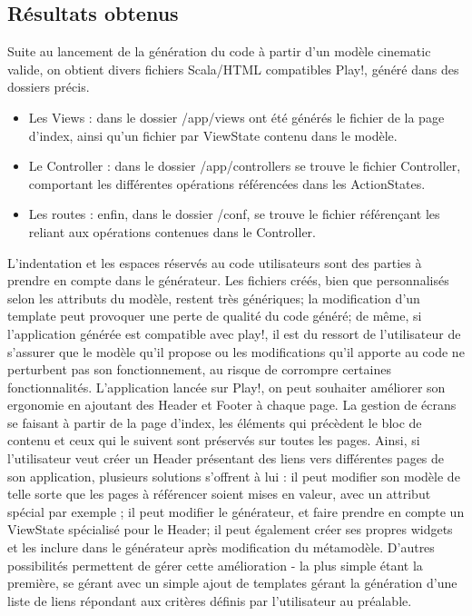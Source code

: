 \subsection{Résultats obtenus}
Suite au lancement de la génération du code à partir d'un modèle cinematic valide, on obtient divers fichiers Scala/HTML compatibles Play!, généré dans des dossiers précis.
\begin{itemize}
\item Les Views : dans le dossier /app/views ont été générés le fichier de la page d'index, ainsi qu'un fichier par ViewState contenu dans le modèle.
\item Le Controller : dans le dossier /app/controllers se trouve le fichier Controller, comportant les différentes opérations référencées dans les ActionStates.
\item Les routes : enfin, dans le dossier /conf, se trouve le fichier référençant les  reliant aux opérations contenues dans le Controller.
\end{itemize}
L'indentation et les espaces réservés au code utilisateurs sont des parties à prendre en compte dans le générateur. Les fichiers créés, bien que personnalisés selon les attributs du modèle, restent très génériques; la modification d'un template peut provoquer une perte de qualité du code généré; de même, si l'application générée est compatible avec play!, il est du ressort de l'utilisateur de s'assurer que le modèle qu'il propose ou les modifications qu'il apporte au code ne perturbent pas son fonctionnement, au risque de corrompre certaines fonctionnalités.
\newline
L'application lancée sur Play!, on peut souhaiter améliorer son ergonomie en ajoutant des Header et Footer à chaque page. La gestion de écrans se faisant à partir de la page d'index, les éléments qui précèdent le bloc de contenu et ceux qui le suivent sont préservés sur toutes les pages. Ainsi, si l'utilisateur veut créer un Header présentant des liens vers différentes pages de son application, plusieurs solutions s'offrent à lui : il peut modifier son modèle de telle sorte que les pages à référencer soient mises en valeur, avec un attribut spécial par exemple ; il peut modifier le générateur, et faire prendre en compte un ViewState spécialisé pour le Header; il peut également créer ses propres widgets et les inclure dans le générateur après modification du métamodèle. D'autres possibilités permettent de gérer cette amélioration - la plus simple étant la première, se gérant avec un simple ajout de templates gérant la génération d'une liste de liens répondant aux critères définis par l'utilisateur au préalable.
